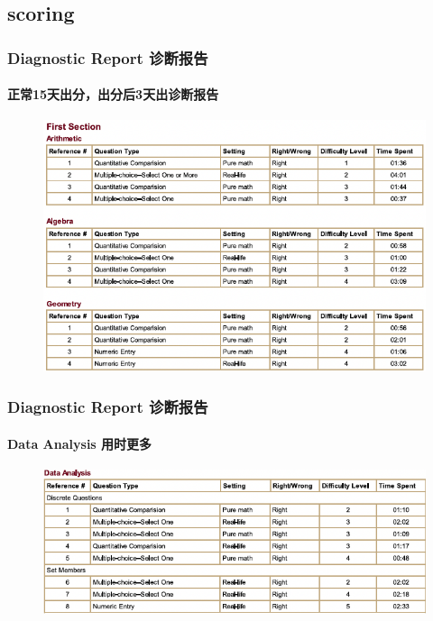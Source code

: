 \documentclass[
	11pt, %
]{beamer}
\begin{document}
\subsection{scoring}

\begin{frame}
	\frametitle{Diagnostic Report 诊断报告}
	\framesubtitle{正常15天出分，出分后3天出诊断报告}
	
	\begin{figure}
		\includegraphics[width=0.9\linewidth]{Diagnostic_Report_Section1_1.png}
	\end{figure}
\end{frame}


\begin{frame}
	\frametitle{Diagnostic Report 诊断报告}
	\framesubtitle{Data Analysis 用时更多}
	
	\begin{figure}
		\includegraphics[width=0.9\linewidth]{Diagnostic_Report_Section1_2.png}
	\end{figure}
\end{frame}

\end{document}
